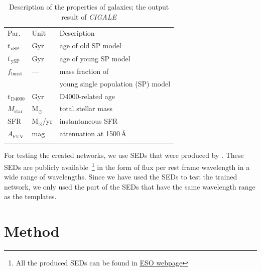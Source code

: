        
\begin{table}
\caption{Description of the properties of \citet{Hossein12} galaxies; the output result of {\em CIGALE}}     
\label{tab: props}
\centering
\begin{tabular}{l l l}
\hline\hline
\noalign{\smallskip}
Par. & Unit & Description\\
\noalign{\smallskip}
\hline
\noalign{\smallskip}
$t_{\,\mathrm{oSP}}$ & Gyr & age of old SP model \\
$t_{\,\mathrm{ySP}}$ & Gyr & age of young SP model \\
$f_\mathrm{burst}$ & --- & mass fraction of \\
& & young single population (SP) model \\
\noalign{\smallskip}
$t_{\,\mathrm{D4000}}$ & Gyr & D4000-related age \\
\noalign{\smallskip}
$M_\mathrm{star}$ & M$_\odot$ & total stellar mass  \\
SFR & M$_\odot$/yr & instantaneous SFR  \\
$A_\mathrm{FUV}$ & mag & attenuation at 1500\,\AA{} \\
\noalign{\smallskip}
\hline
\end{tabular}
\end{table}

    For testing the created networks, we use SEDs that were produced by . 
    These SEDs are publicly available~\footnote{All the  produced SEDs can be found in \href{http://telbib.eso.org/detail.php?bibcode=2012AJ....144..172T}{ESO webpage}} in the form of flux per rest frame wavelength in a wide range of wavelengths.
    Since we have used the  SEDs to test the trained network, we only used the part of the SEDs that have the same wavelength range as the  templates.  



\section{Method}
\label{sec: method}
